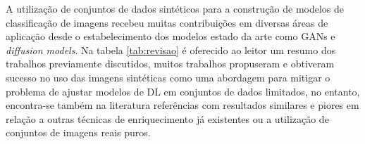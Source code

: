 A utilização de conjuntos de dados sintéticos para a construção de modelos de classificação de imagens recebeu muitas contribuições em diversas áreas de aplicação desde o estabelecimento dos modelos estado da arte como GANs e \textit{diffusion models}.
Na tabela \ref{tab:revisao} é oferecido ao leitor um resumo dos trabalhos previamente discutidos, muitos trabalhos propuseram e obtiveram sucesso no uso das imagens sintéticas como uma abordagem para mitigar o problema de ajustar modelos de DL em conjuntos de dados limitados, no entanto, encontra-se também na literatura referências com resultados similares \cite{xieGANBasedSubInstanceAugmentation2024} e piores \cite{ivanovsSyntheticImageGeneration2023}\cite{deptoQuantifyingImbalancedClassification2023a} \cite{masengiInvestigatingDeepLearning2023} em relação a outras técnicas de enriquecimento já existentes ou a utilização de conjuntos de imagens reais puros.


